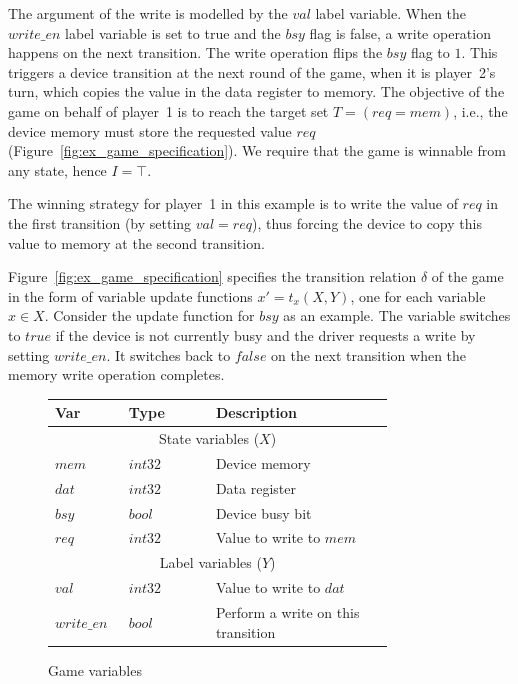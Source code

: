 The argument of the write is modelled by the $val$ label variable. When the $write\_en$ label variable is set to true and the $bsy$ flag is false, a write operation happens on the next transition. The write operation flips the $bsy$ flag to $1$.  This triggers a device transition at the next round of the game, when it is player~2's turn, which copies the value in the data register to memory.  The objective of the game on behalf of player~1 is to reach the target set $T=(req=mem)$, i.e., the device memory must store the requested value $req$ (Figure~\ref{fig:ex_game_specification}).  We require that the game is winnable from any state, hence $I=\top$.  

The winning strategy for player~1 in this example is to write the value of $req$ in the first transition (by setting $val=req$), thus forcing the device to copy this value to memory at the second transition.

Figure~\ref{fig:ex_game_specification} specifies the transition relation $\delta$ of the game in the form of variable update functions $x' = t_x(X,Y)$, one for each variable $x\in X$.  Consider the update function for $bsy$ as an example.  The variable switches to $true$ if the device is not currently busy and the driver requests a write by setting $write\_en$. It switches back to $false$ on the next transition when the memory write operation completes.

\begin{figure}
    \centering
    \label{fig:ex_game_variables}
    \caption{Game variables}
    \begin{tabular}{|p{0.13\linewidth}p{0.22\linewidth}p{0.45\linewidth}|}
        \hline
        {\bf Var} & {\bf Type} & {\bf Description} \\
        \hline\hline
        \multicolumn{3}{|c|}{State variables ($X$)} \\
        \hline
        $mem$ & $int32$ & Device memory           \\
        $dat$ & $int32$ & Data register           \\
        $bsy$ & $bool$  & Device busy bit         \\
        $req$ & $int32$ & Value to write to $mem$ \\
        \hline\hline
        \multicolumn{3}{|c|}{Label variables ($Y$)}    \\
        \hline
        $val$       & $int32$ & Value to write to $dat$ \\
        $write\_en$ & $bool$  & Perform a write on this transition \\
        \hline
    \end{tabular}
\end{figure}


